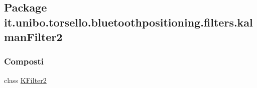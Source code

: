\hypertarget{namespaceit_1_1unibo_1_1torsello_1_1bluetoothpositioning_1_1filters_1_1kalmanFilter2}{}\subsection{Package it.\+unibo.\+torsello.\+bluetoothpositioning.\+filters.\+kalman\+Filter2}
\label{namespaceit_1_1unibo_1_1torsello_1_1bluetoothpositioning_1_1filters_1_1kalmanFilter2}
\subsubsection*{Composti}
\begin{DoxyCompactItemize}
\item 
class \hyperlink{classit_1_1unibo_1_1torsello_1_1bluetoothpositioning_1_1filters_1_1kalmanFilter2_1_1KFilter2}{K\+Filter2}
\end{DoxyCompactItemize}
